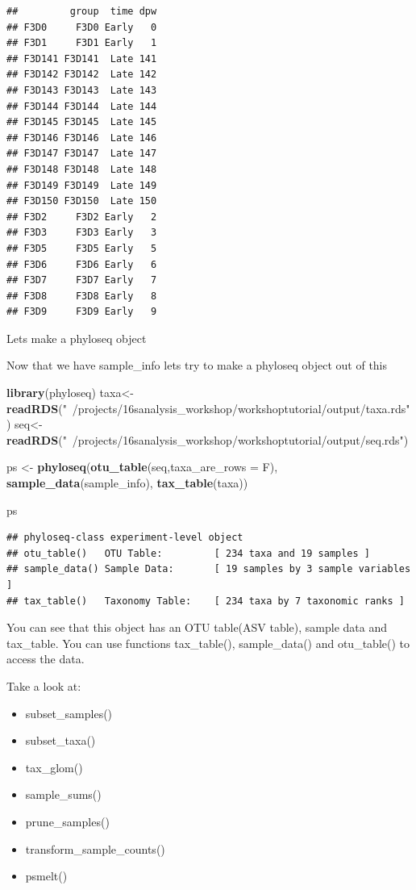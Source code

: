 \documentclass[
]{book}
\newenvironment{Shaded}{\begin{snugshade}}{\end{snugshade}}
\newcommand{\DataTypeTok}[1]{\textcolor[rgb]{0.13,0.29,0.53}{#1}}
\newcommand{\KeywordTok}[1]{\textcolor[rgb]{0.13,0.29,0.53}{\textbf{#1}}}
\newcommand{\NormalTok}[1]{#1}
\newcommand{\StringTok}[1]{\textcolor[rgb]{0.31,0.60,0.02}{#1}}
\providecommand{\tightlist}{%
  \setlength{\itemsep}{0pt}\setlength{\parskip}{0pt}}
\begin{document}
\begin{verbatim}
##         group  time dpw
## F3D0     F3D0 Early   0
## F3D1     F3D1 Early   1
## F3D141 F3D141  Late 141
## F3D142 F3D142  Late 142
## F3D143 F3D143  Late 143
## F3D144 F3D144  Late 144
## F3D145 F3D145  Late 145
## F3D146 F3D146  Late 146
## F3D147 F3D147  Late 147
## F3D148 F3D148  Late 148
## F3D149 F3D149  Late 149
## F3D150 F3D150  Late 150
## F3D2     F3D2 Early   2
## F3D3     F3D3 Early   3
## F3D5     F3D5 Early   5
## F3D6     F3D6 Early   6
## F3D7     F3D7 Early   7
## F3D8     F3D8 Early   8
## F3D9     F3D9 Early   9
\end{verbatim}

Lets make a phyloseq object

Now that we have sample\_info lets try to make a phyloseq object out of this

\begin{Shaded}
\begin{Highlighting}[]
\KeywordTok{library}\NormalTok{(phyloseq)}
\NormalTok{taxa<-}\KeywordTok{readRDS}\NormalTok{(}\StringTok{"~/projects/16sanalysis_workshop/workshoptutorial/output/taxa.rds"}\NormalTok{)}
\NormalTok{seq<-}\KeywordTok{readRDS}\NormalTok{(}\StringTok{"~/projects/16sanalysis_workshop/workshoptutorial/output/seq.rds"}\NormalTok{)}

\NormalTok{ps <-}\StringTok{ }\KeywordTok{phyloseq}\NormalTok{(}\KeywordTok{otu_table}\NormalTok{(seq,}\DataTypeTok{taxa_are_rows =}\NormalTok{ F),}
               \KeywordTok{sample_data}\NormalTok{(sample_info),}
               \KeywordTok{tax_table}\NormalTok{(taxa))}

\NormalTok{ps}
\end{Highlighting}
\end{Shaded}

\begin{verbatim}
## phyloseq-class experiment-level object
## otu_table()   OTU Table:         [ 234 taxa and 19 samples ]
## sample_data() Sample Data:       [ 19 samples by 3 sample variables ]
## tax_table()   Taxonomy Table:    [ 234 taxa by 7 taxonomic ranks ]
\end{verbatim}

You can see that this object has an OTU table(ASV table), sample data and tax\_table. You can use functions tax\_table(), sample\_data() and otu\_table() to access the data.

Take a look at:

\begin{itemize}
\tightlist
\item
  subset\_samples()
\item
  subset\_taxa()
\item
  tax\_glom()
\item
  sample\_sums()
\item
  prune\_samples()
\item
  transform\_sample\_counts()
\item
  psmelt()
\end{itemize}
\end{document}
